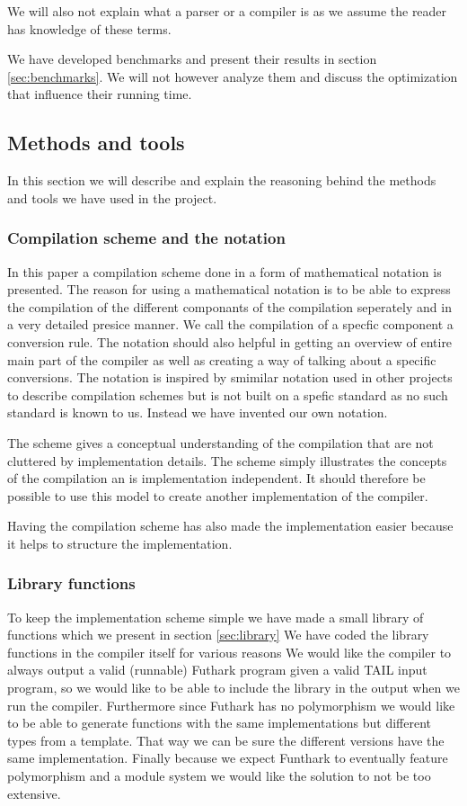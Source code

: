 \documentclass[11pt]{article}
\begin{document}
We will also not explain what a parser or a compiler is as we assume the reader has knowledge of these terms. 

We have developed benchmarks and present their results in section \ref{sec:benchmarks}.
We will not however analyze them and discuss the optimization that influence their running time.

\subsection{Methods and tools}
In this section we will describe and explain the reasoning behind the methods and tools we have used in the project. 

\subsubsection{Compilation scheme and the notation}
In this paper a compilation scheme done in a form of mathematical notation is presented. 
The reason for using a mathematical notation is to be able to express the compilation of the different componants of the compilation seperately and in a very detailed presice manner. We call the compilation of a specfic component a conversion rule. 
The notation should also helpful in getting an overview of entire main part of the compiler as well as creating a way of talking about a specific conversions.
The notation is inspired by smimilar notation used in other projects \cite{TorbenMogensen}\cite{MartinElsmanNotation} to describe compilation schemes but is not built on a spefic standard as no such standard is known to us.
Instead we have invented our own notation.

The scheme gives a conceptual understanding of the compilation that are not cluttered by implementation details.
The scheme simply illustrates the concepts of the compilation an is implementation independent.
It should therefore be possible to use this model to create another implementation of the compiler.

Having the compilation scheme has also made the implementation easier because it helps to structure the implementation. 

\subsubsection{Library functions}
To keep the implementation scheme simple we have made a small library of functions which we present in section \ref{sec:library} 
We have coded the library functions in the compiler itself for various reasons
We would like the compiler to always output a valid (runnable) Futhark program given a valid TAIL input program, so we would like to
be able to include the library in the output when we run the compiler.
Furthermore since Futhark has no polymorphism we would like to be able to
generate functions with the same implementations but different types from a template.
That way we can be sure the different versions have the same implementation.
Finally because we expect Funthark to eventually feature polymorphism and a module system we would like the solution to not be too
extensive\cite{TroelsHenriksen}. 
\end{document}
